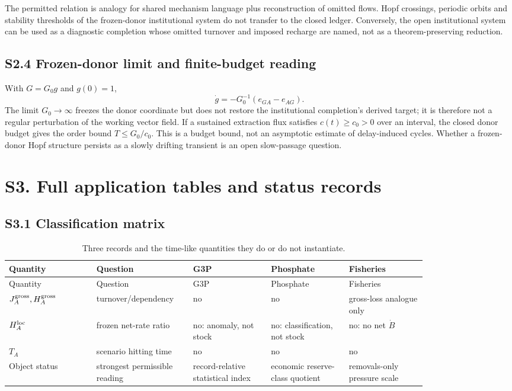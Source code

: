 \documentclass[11pt]{article}
\begin{document}
The permitted relation is analogy for shared mechanism language plus reconstruction of omitted flows. Hopf crossings, periodic orbits and stability thresholds of the frozen-donor institutional system do not transfer to the closed ledger. Conversely, the open institutional system can be used as a diagnostic completion whose omitted turnover and imposed recharge are named, not as a theorem-preserving reduction.

\subsection*{S2.4 Frozen-donor limit and finite-budget reading}

With $G=G_0g$ and $g(0)=1$,
\begin{equation}
\dot g=-G_0^{-1}(e_{GA}-e_{AG}).
\end{equation}
The limit $G_0\to\infty$ freezes the donor coordinate but does not restore the institutional completion's derived target; it is therefore not a regular perturbation of the working vector field. If a sustained extraction flux satisfies $c(t)\geq c_0>0$ over an interval, the closed donor budget gives the order bound $T\leq G_0/c_0$. This is a budget bound, not an asymptotic estimate of delay-induced cycles. Whether a frozen-donor Hopf structure persists as a slowly drifting transient is an open slow-passage question.

\section*{S3. Full application tables and status records}

\subsection*{S3.1 Classification matrix}

\small
\begin{longtable}{@{}P{0.18\linewidth}P{0.16\linewidth}P{0.16\linewidth}P{0.16\linewidth}P{0.16\linewidth}@{}}
\caption{Three records and the time-like quantities they do or do not instantiate.}\label{tab:classification}\\
\toprule
Quantity & Question & G3P & Phosphate & Fisheries \\
\midrule
\endfirsthead
\toprule
Quantity & Question & G3P & Phosphate & Fisheries \\
\midrule
\endhead
\bottomrule
\endfoot
$J_A^{\rm gross},H_A^{\rm gross}$ & turnover/\allowbreak{}dependency & no & no & gross-loss analogue only \\
$H_A^{\rm loc}$ & frozen net-rate ratio & no: anomaly, not stock & no: classification, not stock & no: no net $\dot B$ \\
$T_A$ & scenario hitting time & no & no & no \\
Object status & strongest permissible reading & record-relative statistical index & economic reserve-class quotient & removals-only pressure scale \\
\end{longtable}
\normalsize
\end{document}
